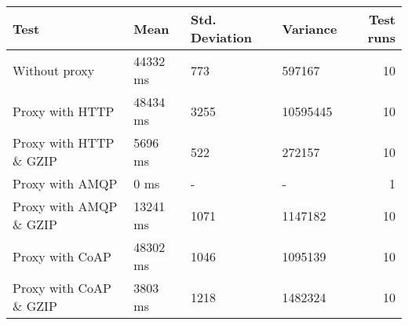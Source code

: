 \begin{tabular}{llllr}
\hline
 Test                   & Mean     & Std. Deviation   & Variance   &   Test runs \\
\hline
 Without proxy          & 44332 ms & 773              & 597167     &          10 \\
 Proxy with HTTP        & 48434 ms & 3255             & 10595445   &          10 \\
 Proxy with HTTP \& GZIP & 5696 ms  & 522              & 272157     &          10 \\
 Proxy with AMQP        & 0 ms     & -                & -          &           1 \\
 Proxy with AMQP \& GZIP & 13241 ms & 1071             & 1147182    &          10 \\
 Proxy with CoAP        & 48302 ms & 1046             & 1095139    &          10 \\
 Proxy with CoAP \& GZIP & 3803 ms  & 1218             & 1482324    &          10 \\
\hline
\end{tabular}